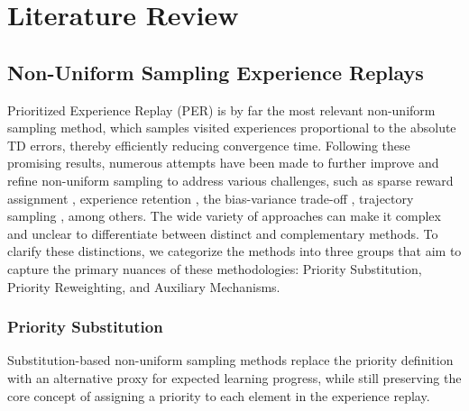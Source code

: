 
\chapter{Literature Review}

\section{Non-Uniform Sampling Experience Replays}

Prioritized Experience Replay (PER) \cite{schaul2015prioritized} is by far the most relevant non-uniform sampling method, which samples visited experiences proportional to the absolute TD errors, thereby efficiently reducing convergence time. Following these promising results, numerous attempts have been made to further improve and refine non-uniform sampling to address various challenges, such as sparse reward assignment \cite{andrychowicz2017hindsight, dai2021diversity}, experience retention \cite{de2018experience}, the bias-variance trade-off \cite{fedus2020revisiting, hessel2018rainbow, sutton1988learning, sutton2018reinforcement}, trajectory sampling \cite{dai2021diversity, liu2023prioritized}, among others. The wide variety of approaches can make it complex and unclear to differentiate between distinct and complementary methods. To clarify these distinctions, we categorize the methods into three groups that aim to capture the primary nuances of these methodologies: Priority Substitution, Priority Reweighting, and Auxiliary Mechanisms.

\subsection{Priority Substitution}


Substitution-based non-uniform sampling methods replace the priority definition with an alternative proxy for expected learning progress, while still preserving the core concept of assigning a priority to each element in the experience replay.
 
